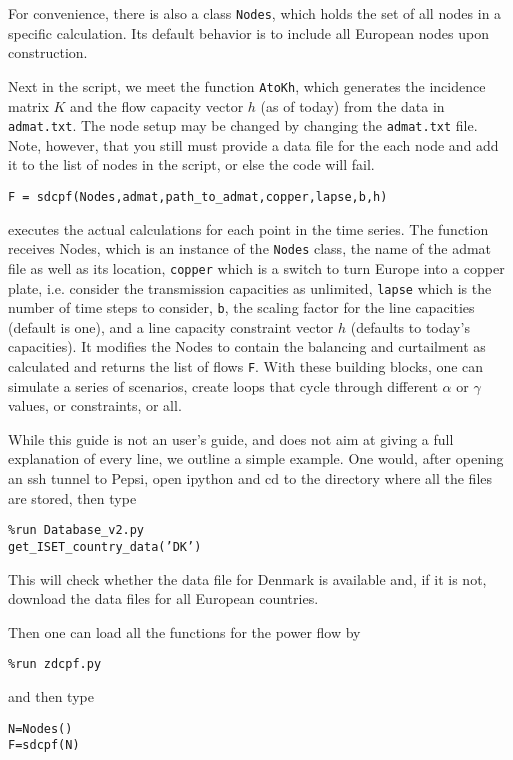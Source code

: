 \documentclass[english,twoside,a4paper,11pt]{article}
\numberwithin{equation}{section}
\begin{document}
For convenience, there is also a class \texttt{Nodes}, which holds the
set of all nodes in a specific calculation. Its default behavior is to
include all European nodes upon construction.

Next in the script, we meet the function \texttt{AtoKh}, which
generates the incidence matrix $K$ and the flow capacity vector $h$
(as of today) from the data in \texttt{admat.txt}. The node setup may
be changed by changing the \texttt{admat.txt} file. Note, however,
that you still must provide a data file for the each node and add it
to the list of nodes in the script, or else the code will fail.

\noindent
\texttt{F = sdcpf(Nodes,admat,path\_to\_admat,copper,lapse,b,h)}

executes the actual calculations for each point in the time
series. The function receives Nodes, which is an instance of the
\texttt{Nodes} class, the name of the admat file as well as its
location, \texttt{copper} which is a
switch to turn Europe into a copper plate, i.e. consider the
transmission capacities as unlimited, \texttt{lapse} which is the
number of time steps to consider, \texttt{b}, the scaling factor for
the line capacities (default is one), and a line capacity constraint
vector $h$ (defaults to today's capacities). It modifies the Nodes to
contain the balancing and curtailment as calculated and returns the
list of flows \texttt{F}.
With these building blocks, one can simulate a series of scenarios,
create loops that cycle through different $\alpha$ or $\gamma$ values,
or constraints, or all.

While this guide is not an user's guide, and does not aim at giving a
full explanation of every line, we outline a simple example. One would,
after opening an ssh tunnel to Pepsi, open ipython and cd to the
directory where all the files are stored, then type

\noindent \texttt{\%run Database\_v2.py \\
get\_ISET\_country\_data('DK')
}

This will check whether the data file for Denmark is available and, if
it is not, download the data files for all European countries.

Then one can load all the functions for the power flow by 

\noindent \texttt{\%run zdcpf.py
}

\noindent and then type

\noindent \texttt{N=Nodes()\\
F=sdcpf(N)
}
\end{document}
